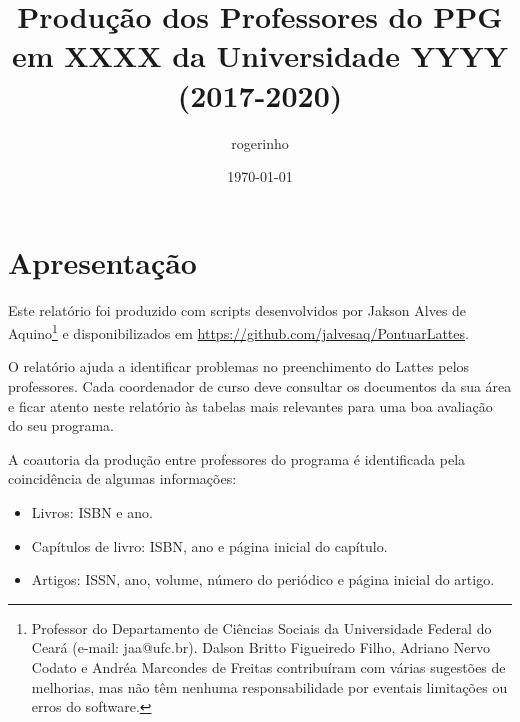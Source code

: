 \documentclass[12pt,brazil]{article}\usepackage[]{graphicx}\usepackage[]{xcolor}
\makeatletter
\newenvironment{kframe}{%
 \def\at@end@of@kframe{}%
 \ifinner\ifhmode%
  \def\at@end@of@kframe{\end{minipage}}%
  \begin{minipage}{\columnwidth}%
 \fi\fi%
 \def\FrameCommand##1{\hskip\@totalleftmargin \hskip-\fboxsep
 \colorbox{shadecolor}{##1}\hskip-\fboxsep
     \hskip-\linewidth \hskip-\@totalleftmargin \hskip\columnwidth}%
 \MakeFramed {\advance\hsize-\width
   \@totalleftmargin\z@ \linewidth\hsize
   \@setminipage}}%
 {\par\unskip\endMakeFramed%
 \at@end@of@kframe}
\newcounter{tabela}
\makeatother
\begin{document}
\begin{kframe}


{\ttfamily\noindent\bfseries\color{errorcolor}{\#\# Error in p\$qualis[i] <- p\$q17[i]: substituto tem comprimento zero}}\end{kframe}

\title{Produção dos Professores do PPG em XXXX da Universidade YYYY (2017-2020)}
\author{rogerinho}
\date{\today}

\maketitle

\tableofcontents

\newpage

\listoftables

\clearpage


\section{Apresentação}

Este relatório foi produzido com scripts desenvolvidos por Jakson Alves de
Aquino\footnote{Professor do Departamento de Ciências Sociais da Universidade
Federal do Ceará (e-mail: jaa@ufc.br). Dalson Britto Figueiredo Filho, Adriano
Nervo Codato e Andréa Marcondes de Freitas contribuíram com várias sugestões
de melhorias, mas não têm nenhuma responsabilidade por eventais limitações ou
erros do software.} e disponibilizados em
\url{https://github.com/jalvesaq/PontuarLattes}.

O relatório ajuda a identificar problemas no preenchimento do Lattes pelos
professores. Cada coordenador de curso deve consultar os documentos
da sua área e ficar atento neste relatório às tabelas mais
relevantes para uma boa avaliação do seu programa.

A coautoria da produção entre professores do programa é identificada pela
coincidência de algumas informações:

\begin{itemize}

    \item Livros: ISBN e ano.

    \item Capítulos de livro: ISBN, ano e página inicial do capítulo.

    \item Artigos: ISSN, ano, volume, número do periódico e página inicial do
        artigo.

\end{itemize}
\end{document}
